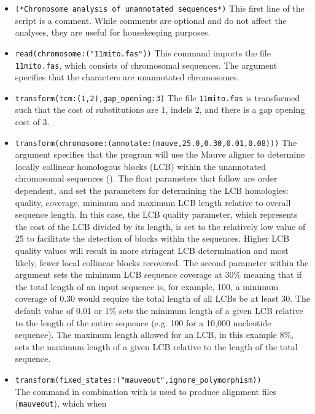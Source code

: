 \begin{itemize}
\item \texttt{(*Chromosome analysis of unannotated sequences*)} This first line of the script is a comment. While 
comments are optional and do not affect the analyses, they are useful for housekeeping purposes.
\item \texttt{read(chromosome:("11mito.fas"))} This command imports the file \texttt{11mito.fas}, which consists of 
chromosomal sequences. The argument  specifies that the characters are unannotated 
chromosomes.
\item \texttt{transform(tcm:(1,2),gap\_opening:3)} The file \texttt{11mito.fas} is transformed such that the cost of substitutions 
are $1$, indels $2$, and there is a gap opening cost of $3$.
\item \texttt{transform(chromosome:(annotate:(mauve,25.0,0.30,0.01,0.08)))} The argument  
specifies that the program will use the Mauve aligner \cite{darlingetal2004} to determine locally collinear 
homologous blocks (LCB) within the unannotated chromosomal sequences ().
The float parameters that follow  are order dependent, and set the parameters for determining 
the LCB homologies: quality, coverage, minimum and maximum LCB length relative to overall 
sequence length. In this case, the LCB quality parameter, which represents the cost of the LCB divided by its length, 
is set to the relatively low value of 25 to facilitate the detection of blocks within the sequences.  Higher LCB 
quality values will result in more stringent LCB determination and most likely, fewer local collinear blocks recovered.  The 
second parameter within the argument  sets the minimum LCB sequence coverage at 
30\% meaning that if the total length of an input sequence is, for example, 100, a minimum coverage of 0.30 would require 
the total length of all LCBs be at least 30. The default value of 0.01 or 1\% sets the minimum length of a given LCB 
relative to the length of the entire sequence (e.g. 100 for a 10,000 nucleotide sequence). The maximum length 
allowed for an LCB, in this example 8\%, sets the maximum length of a given LCB relative to the length of the total sequence.
\item \texttt{transform(fixed\_states:("mauveout",ignore\_polymorphism))} \\ The  command 
in combination with  is used to produce alignment files (\texttt{mauveout}), which when  

\end{itemize}
